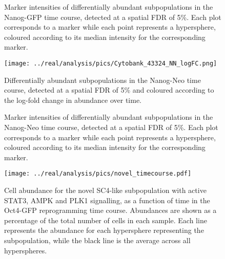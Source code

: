 \documentclass{article}
\begin{document}
\begin{figure}[p]
    \begin{center}
    \end{center}
    \caption{
        Marker intensities of differentially abundant subpopulations in the Nanog-GFP time course, detected at a spatial FDR of 5\%.
        Each plot corresponds to a marker while each point represents a hypersphere, coloured according to its median intensity for the corresponding marker.
    }
\end{figure}

\begin{figure}[p]
    \begin{center}
    \texttt{[image: ../real/analysis/pics/Cytobank\_43324\_NN\_logFC.png]}
    \end{center}
    \caption{
        Differentially abundant subpopulations in the Nanog-Neo time course, detected at a spatial FDR of 5\% and coloured according to the log-fold change in abundance over time.
    }
\end{figure}

\begin{figure}[p]
    \begin{center}
    \end{center}
    \caption{
        Marker intensities of differentially abundant subpopulations in the Nanog-Neo time course, detected at a spatial FDR of 5\%.
        Each plot corresponds to a marker while each point represents a hypersphere, coloured according to its median intensity for the corresponding marker.
    }
\end{figure}

\begin{figure}[p]
    \begin{center}
        \texttt{[image: ../real/analysis/pics/novel\_timecourse.pdf]}
    \end{center}
    \caption{
        Cell abundance for the novel SC4-like subpopulation with active STAT3, AMPK and PLK1 signalling, as a function of time in the Oct4-GFP reprogramming time course.
        Abundances are shown as a percentage of the total number of cells in each sample.
        Each line represents the abundance for each hypersphere representing the subpopulation, while the black line is the average across all hyperspheres.
    }
\end{figure}
\end{document}
